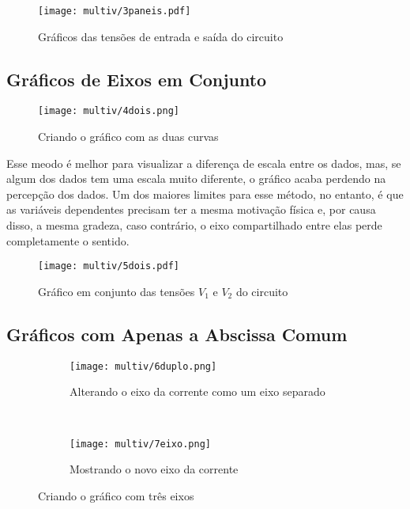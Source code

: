     \begin{figure}[H]
        \centering
        \texttt{[image: multiv/3paneis.pdf]}

        \caption{Gráficos das tensões de entrada e saída do circuito}
        \label{fig:multiv:paneis}
    \end{figure}


\subsection{Gráficos de Eixos em Conjunto} \label{sec:multiv:juntos}

    \begin{figure}[htbp]
        \centering
        \texttt{[image: multiv/4dois.png]}

        \caption{Criando o gráfico com as duas curvas}
        \label{fig:multiv:juntos:tutorial}
    \end{figure}

    Esse meodo é melhor para visualizar a diferença de escala entre os dados, mas, se algum dos dados tem uma escala muito diferente, o gráfico acaba perdendo na percepção dos dados. Um dos maiores limites para esse método, no entanto, é que as variáveis dependentes precisam ter a mesma motivação física e, por causa disso, a mesma gradeza, caso contrário, o eixo compartilhado entre elas perde completamente o sentido.

    \begin{figure}[htbp]
        \centering
        \texttt{[image: multiv/5dois.pdf]}

        \caption{Gráfico em conjunto das tensões $V_1$ e $V_2$ do circuito}
        \label{fig:multiv:juntos}
    \end{figure}


\subsection{Gráficos com Apenas a Abscissa Comum}

    \begin{figure}[htbp]
        \centering
        \begin{subfigure}{0.35\textwidth}
            \centering
            \texttt{[image: multiv/6duplo.png]}

            \caption{Alterando o eixo da corrente como um eixo separado}
            \label{fig:multiv:duplo:eixo}
        \end{subfigure}
        ~
        \begin{subfigure}{0.6\textwidth}
            \centering
            \texttt{[image: multiv/7eixo.png]}

            \caption{Mostrando o novo eixo da corrente}
            \label{fig:multiv:duplo:eixado}
        \end{subfigure}
        \caption{Criando o gráfico com três eixos}
        \label{fig:multiv:duplo:tutorial}
    \end{figure}

